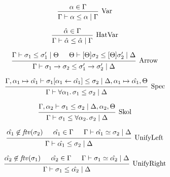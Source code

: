 \documentclass[12pt]{article}
\begin{document}
\pagestyle{empty}

\[
    \begin{prooftree}
        \hypo{\alpha \in \Gamma}
        \infer1[Var]{\Gamma \vdash \alpha \leq \alpha \mid \Gamma}
    \end{prooftree}
\]

\[
    \begin{prooftree}
        \hypo{\hat{\alpha} \in \Gamma}
        \infer1[HatVar]{\Gamma \vdash \hat{\alpha} \leq \hat{\alpha} \mid \Gamma}
    \end{prooftree}
\]

\[
    \begin{prooftree}
        \hypo{\Gamma \vdash \sigma_1 \leq \sigma_1' \mid \Theta}
        \hypo{\Theta \vdash [\Theta]\sigma_2 \leq [\Theta]\sigma_2' \mid \Delta}
        \infer2[Arrow]{\Gamma \vdash \sigma_1 \to \sigma_2 \leq \sigma_1' \to \sigma_2' \mid \Delta}
    \end{prooftree}
\]

\[
    \begin{prooftree}
        \hypo{\Gamma, \alpha_1 \mapsto \hat{\alpha_1} \vdash \sigma_1[\alpha_1 \leftarrow \hat{\alpha_1}] \leq \sigma_2 \mid \Delta, \alpha_1 \mapsto \hat{\alpha_1}, \Theta}
        \infer1[Spec]{\Gamma \vdash \forall \alpha_1\ldotp \sigma_1 \leq \sigma_2 \mid \Delta}
    \end{prooftree}
\]

\[
    \begin{prooftree}
        \hypo{\Gamma, \alpha_2 \vdash \sigma_1 \leq \sigma_2 \mid \Delta, \alpha_2, \Theta}
        \infer1[Skol]{\Gamma \vdash \sigma_1 \leq \forall \alpha_2\ldotp \sigma_2 \mid \Delta}
    \end{prooftree}
\]

\[
    \begin{prooftree}
        \hypo{\hat{\alpha_1} \not\in \mathit{ftv}(\sigma_2)}
        \hypo{\hat{\alpha_1} \in \Gamma}
        \hypo{\Gamma \vdash \hat{\alpha_1} \simeq \sigma_2 \mid \Delta}
        \infer3[UnifyLeft]{\Gamma \vdash \hat{\alpha_1} \leq \sigma_2 \mid \Delta}
    \end{prooftree}
\]

\[
    \begin{prooftree}
        \hypo{\hat{\alpha_2} \not\in \mathit{ftv}(\sigma_1)}
        \hypo{\hat{\alpha_2} \in \Gamma}
        \hypo{\Gamma \vdash \sigma_1 \simeq \hat{\alpha_2} \mid \Delta}
        \infer3[UnifyRight]{\Gamma \vdash \sigma_1 \leq \hat{\alpha_2} \mid \Delta}
    \end{prooftree}
\]
\end{document}
